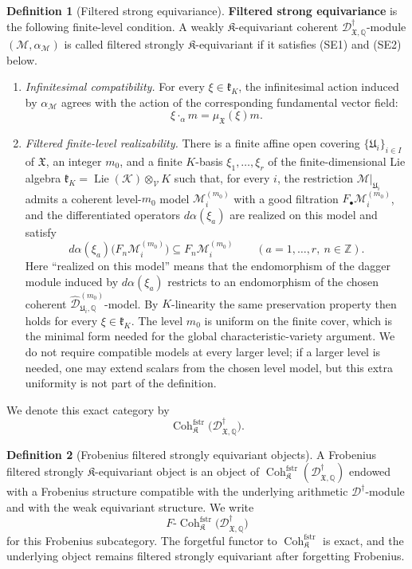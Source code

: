 \documentclass[11pt]{amsart}
\theoremstyle{plain}
\theoremstyle{definition}
\newtheorem{definition}{Definition}[section]
\theoremstyle{remark}
\newcommand{\Coh}{\operatorname{Coh}}
\newcommand{\Lie}{\operatorname{Lie}}
\newcommand{\fstr}{\mathrm{fstr}}
\begin{document}
\begin{definition}[Filtered strong equivariance]
\label{def:strong-equivariance}
\textup{\textbf{Filtered strong equivariance}} is the following finite-level
condition.  A weakly \(\mathfrak K\)-equivariant coherent
\(\mathscr D^\dagger_{\mathfrak X,\mathbb Q}\)-module
\((\mathcal M,\alpha_{\mathcal M})\) is called filtered strongly
\(\mathfrak K\)-equivariant if it satisfies \textup{(SE1)} and
\textup{(SE2)} below.
\begin{enumerate}[label=\textup{(SE\arabic*)}]
\item \emph{Infinitesimal compatibility.}  For every
\(\xi\in\mathfrak k_K\), the infinitesimal action induced by
\(\alpha_{\mathcal M}\) agrees with the action of the corresponding
fundamental vector field:
\[
  \xi\cdot_{\alpha}m=\mu_{\mathfrak X}(\xi)m.
\]
\item \emph{Filtered finite-level realizability.} There is a finite
affine open covering \(\{\mathfrak U_i\}_{i\in I}\) of
\(\mathfrak X\), an integer \(m_0\), and a finite \(K\)-basis
\(\xi_1,\ldots,\xi_r\) of the finite-dimensional Lie algebra
\(\mathfrak k_K=\Lie(\mathcal K)\otimes_{\mathcal V}K\) such that, for every
\(i\), the restriction \(\mathcal M|_{\mathfrak U_i}\) admits a coherent
level-\(m_0\) model \(\mathcal M_i^{(m_0)}\) with a good filtration
\(F_\bullet\mathcal M_i^{(m_0)}\), and the differentiated operators
\(d\alpha(\xi_a)\) are realized on this model and satisfy
\[
  d\alpha(\xi_a)\bigl(F_n\mathcal M_i^{(m_0)}\bigr)
  \subseteq F_n\mathcal M_i^{(m_0)}
  \qquad(a=1,\ldots,r,\ n\in\mathbb Z).
\]
Here ``realized on this model'' means that the endomorphism of the dagger
module induced by \(d\alpha(\xi_a)\) restricts to an endomorphism of the
chosen coherent
\(\widehat{\mathscr D}^{(m_0)}_{\mathfrak U_i,\mathbb Q}\)-model.  By
\(K\)-linearity the same preservation property then holds for every
\(\xi\in\mathfrak k_K\).  The level \(m_0\) is uniform on the finite cover,
which is the minimal form needed for the global characteristic-variety
argument.  We do not require compatible models at every larger level; if a
larger level is needed, one may extend scalars from the chosen level model, but
this extra uniformity is not part of the definition.
\end{enumerate}
We denote this exact category by
\[
  \Coh^{\fstr}_{\mathfrak K}
  \bigl(\mathscr D^\dagger_{\mathfrak X,\mathbb Q}\bigr).
\]
\end{definition}

\begin{definition}[Frobenius filtered strongly equivariant objects]
\label{def:F-fstr-category}
A Frobenius filtered strongly \(\mathfrak K\)-equivariant object is an object of
\(
  \Coh^{\fstr}_{\mathfrak K}
  (\mathscr D^\dagger_{\mathfrak X,\mathbb Q})
\)
endowed with a Frobenius structure compatible with the underlying arithmetic
\(\mathscr D^\dagger\)-module and with the weak equivariant structure.  We write
\[
  F\text{-}\Coh^{\fstr}_{\mathfrak K}
  \bigl(\mathscr D^\dagger_{\mathfrak X,\mathbb Q}\bigr)
\]
for this Frobenius subcategory.  The forgetful functor to
\(\Coh^{\fstr}_{\mathfrak K}\) is exact, and the underlying object remains
filtered strongly equivariant after forgetting Frobenius.
\end{definition}
\end{document}
